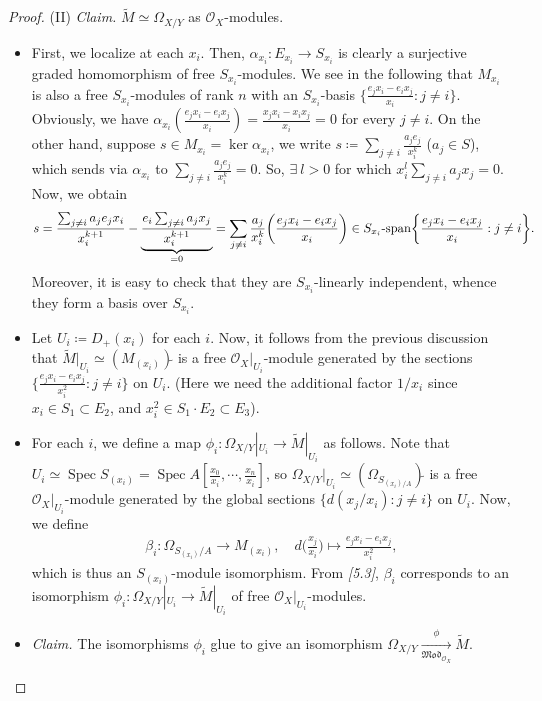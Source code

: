 \documentclass[11pt,a4paper,footinclude=true,headinclude=true]{scrbook} %
\DeclareMathOperator{\Spec}{Spec}
\newcommand{\OO}{\mathcal{O}}
\newcommand{\<}{\langle}
\newcommand{\>}{\rangle}
\newcommand{\spn}{\mathchar`-\mathrm{span}}
\newcommand{\MOD}{\mathfrak{Mod}}
\begin{document}
\begin{proof}
    (II) \textit{Claim.} $\widetilde{M}\simeq\Omega_{X/Y}$ as $\OO_X$-modules.
    \begin{itemize}
        \item First, we localize at each $x_i$. Then, $\alpha_{x_i}:E_{x_i}\to S_{x_i}$ is clearly a surjective graded  homomorphism of free $S_{x_i}$-modules. We see in the following that $M_{x_i}$ is also a free $S_{x_i}$-modules of rank $n$ with an $S_{x_i}$-basis $\{\frac{e_jx_i-e_ix_j}{x_i}:j\neq i\}$. Obviously, we have $\alpha_{x_i}(\frac{e_jx_i-e_ix_j}{x_i})=\frac{x_jx_i-x_ix_j}{x_i}=0$ for every $j\neq i$. On the other hand, suppose $s\in M_{x_i}=\ker\alpha_{x_i}$, we write $s\coloneqq\sum_{j\neq i}\frac{a_je_j}{x_i^k}$ ($a_j\in S$), which sends via $\alpha_{x_i}$ to $\sum_{j\neq i}\frac{a_je_j}{x_i^k}=0$. So, $\exists\ l>0$ for which $x_i^l\sum_{j\neq i}a_jx_j=0$. Now, %
        we obtain
        \begin{align*}
            s=\frac{\sum_{j\neq i}a_je_jx_i}{x_i^{k+1}}-\underbrace{\frac{e_i\sum_{j\neq i}a_jx_j}{x_i^{k+1}}}_{=0}=\sum_{j\neq i}\frac{a_j}{x_i^k}\bigg(\frac{e_jx_i-e_ix_j}{x_i}\bigg)\in S_{x_i}\spn\bigg\{\frac{e_jx_i-e_ix_j}{x_i}:j\neq i\bigg\}.
        \end{align*}
        Moreover, it is easy to check that they are $S_{x_i}$-linearly independent, whence they form a basis over $S_{x_i}$.
        \item Let $U_i\coloneqq D_+(x_i)$ for each $i$. Now, it follows from the previous discussion that $\widetilde{M}|_{U_i}\simeq(M_{(x_i)})\widetilde{}$ is a free $\OO_X|_{U_i}$-module generated by the sections $\{\frac{e_jx_i-e_ix_j}{x_i^2}:j\neq i\}$ on $U_i$. (Here we need the additional factor $1/x_i$ since $x_i\in S_1\subset E_2$, and $x_i^2\in S_1\cdot E_2\subset E_3$). 
        \item For each $i$, we define a map $\phi_i:\Omega_{X/Y}|_{U_i}\to\widetilde{M}|_{U_i}$ as follows. Note that $U_i\simeq\Spec S_{(x_i)}=\Spec A[\frac{x_0}{x_i},\cdots,\frac{x_n}{x_i}]$, so $\Omega_{X/Y}|_{U_i}\simeq(\Omega_{S_{(x_i)/A}})\widetilde{}$ is a free $\OO_X|_{U_i}$-module generated by the global sections $\{d(x_j/x_i):j\neq i\}$ on $U_i$. Now, we define
        \begin{align*}
            \beta_i:\Omega_{S_{(x_i)}/A}\longrightarrow M_{(x_i)},\quad d\Big(\frac{x_j}{x_i}\Big)\longmapsto\frac{e_jx_i-e_ix_j}{x_i^2},
        \end{align*}
        which is thus an $S_{(x_i)}$-module isomorphism. From \textit{[5.3]}, $\beta_i$ corresponds to an isomorphism $\phi_i:\Omega_{X/Y}|_{U_i}\to\widetilde{M}|_{U_i}$ of free $\OO_X|_{U_i}$-modules.
        \item \textit{Claim.} The isomorphisms $\phi_i$ glue to give an isomorphism $\Omega_{X/Y}\xrightarrow[\MOD_{\OO_X}]{\phi}\widetilde{M}$.
        

\end{itemize}
\end{proof}
\end{document}
